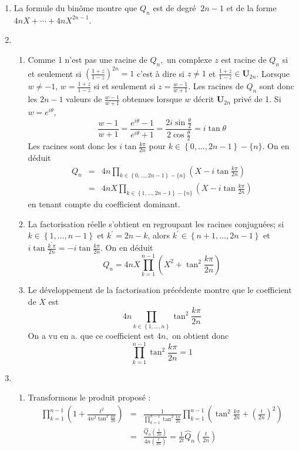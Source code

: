 \begin{enumerate}
\item  La formule du bin\^{o}me montre que $Q_{n}$ est de degr\'{e} $\ 2n-1$ et de la forme $4nX+\cdots +4nX^{2n-1}$.
\item 
\begin{enumerate}
\item Comme 1 n'est pas une racine de $Q_{n},$ un complexe $z$ est racine de $Q_{n}$ si et seulement si $\left( \frac{1+z}{1-z}\right) ^{2n}=1$ c'est \`{a} dire si $z\neq 1$ et $\frac{1+z}{1-z}\in \mathbf{U}_{2n}$.
\newline 
Lorsque $w\neq -1$, $w=\frac{1+z}{1-z}$ si et seulement si $z=\frac{w-1}{w+1}$.
\newline
Les racines de $Q_{n}$ sont donc les $2n-1$ valeurs de $\frac{w-1}{w+1}$ obtenues lorsque $w$ d\'{e}crit $\mathbf{U}_{2n}$ priv\'{e} de 1.
\newline
Si $w=e^{i\theta }$, 
\[
\frac{w-1}{w+1}=\frac{e^{i\theta }-1}{e^{i\theta }+1}=\frac{2i\sin \frac{\theta }{2}}{2\cos \frac{\theta }{2}}=i\tan \theta 
\]
Les racines sont donc les $i\tan \frac{k\pi }{2n}$ pour $k\in \left\{ 0,\ldots,2n-1\right\} -\{n\}$. On en d\'{e}duit 
\begin{eqnarray*}
Q_{n}&=&4n\prod_{k\in \left\{ 0,\ldots ,2n-1\right\} -\{n\}}(X-i\tan \frac{k\pi }{2n})\\
&=&4nX\prod_{k\in \left\{ 1,\ldots ,2n-1\right\} -\{n\}}(X-i\tan \frac{k\pi }{2n})
\end{eqnarray*}
en tenant compte du coefficient dominant.
\item La factorisation r\'{e}elle s'obtient en regroupant les racines conjugu\'{e}es; si $k\in \left\{ 1,\ldots ,n-1\right\} $ et $k^{\prime }=2n-k$, alors 
$k^{\prime }\in \left\{ n+1,\ldots ,2n-1\right\} $ et $i\tan \frac{k^{\prime }\pi }{2n}=-i\tan \frac{k\pi }{2n}$. On en d\'{e}duit 
\[
Q_{n}=4nX\prod_{k=1}^{n-1}(X^{2}+\tan ^{2}\frac{k\pi }{2n})
\]
\item Le d\'{e}veloppement de la factorisation pr\'{e}c\'{e}dente
montre que le coefficient de $X$ est 
\[
4n\prod_{k\in \left\{ 1,\ldots,n\right\} }\tan ^{2}\frac{k\pi }{2n}
\]
On a vu en a. que ce coefficient est $4n,$ on obtient donc 
\[
\prod_{k=1}^{n-1}\tan ^{2}\frac{k\pi }{2n}=1
\]
\end{enumerate}

\item 
\begin{enumerate}
\item Transformons le produit propos\'{e} : 
\begin{eqnarray*}
\prod_{k=1}^{n-1}\left( 1+\frac{t^{2}}{4n^{2}\tan ^{2}\frac{k\pi }{2n}}\right) &=&\frac{1}{\prod_{k=1}^{n-1}\tan ^{2}\frac{k\pi }{2n}}\prod_{k=1}^{n-1}\left( \tan ^{2}\frac{k\pi }{2n}+\left( \frac{t}{2n}\right)^{2}\right)\\ &=&\frac{\widehat{Q}_{n}(\frac{t}{2n})}{4n\left( \frac{t}{2n}\right) }=\frac{1}{2t}\widehat{Q}_{n}(\frac{t}{2n})
\end{eqnarray*}


\end{enumerate}
\end{enumerate}

